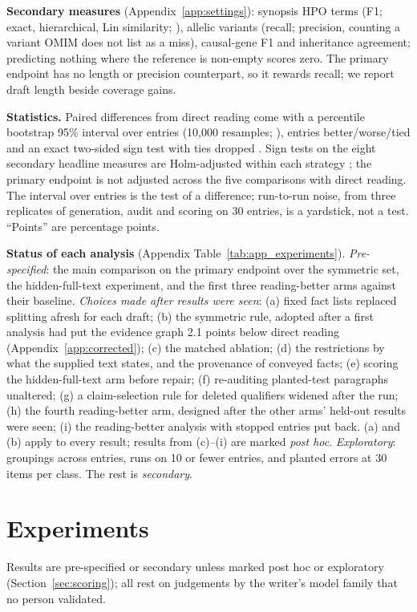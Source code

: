 \documentclass{article} %
\begin{document}
\textbf{Secondary measures} (Appendix~\ref{app:settings}): synopsis HPO terms (F1; exact, hierarchical, Lin similarity; \citealp{Khler2009ClinicalDiagnostics,Resnik1995UsingInformation}), allelic variants (recall; precision, counting a variant OMIM does not list as a miss), causal-gene F1 and inheritance agreement; predicting nothing where the reference is non-empty scores zero. The primary endpoint has no length or precision counterpart, so it rewards recall; we report draft length beside coverage gains.

\textbf{Statistics.} Paired differences from direct reading come with a percentile bootstrap 95\% interval over entries (10,000 resamples; \citealp{Efron1979BootstrapMethods}), entries better/worse/tied and an exact two-sided sign test with ties dropped \citep{Dixon1946StatisticalSign}. Sign tests on the eight secondary headline measures are Holm-adjusted within each strategy \citep{holm1979simple}; the primary endpoint is not adjusted across the five comparisons with direct reading. The interval over entries is the test of a difference; run-to-run noise, from three replicates of generation, audit and scoring on 30 entries, is a yardstick, not a test. ``Points'' are percentage points.

\textbf{Status of each analysis} (Appendix Table~\ref{tab:app_experiments}). \emph{Pre-specified}: the main comparison on the primary endpoint over the symmetric set, the hidden-full-text experiment, and the first three reading-better arms against their baseline. \emph{Choices made after results were seen}: (a) fixed fact lists replaced splitting afresh for each draft; (b) the symmetric rule, adopted after a first analysis had put the evidence graph 2.1 points below direct reading (Appendix~\ref{app:corrected}); (c) the matched ablation; (d) the restrictions by what the supplied text states, and the provenance of conveyed facts; (e) scoring the hidden-full-text arm before repair; (f) re-auditing planted-test paragraphs unaltered; (g) a claim-selection rule for deleted qualifiers widened after the run; (h) the fourth reading-better arm, designed after the other arms' held-out results were seen; (i) the reading-better analysis with stopped entries put back. (a) and (b) apply to every result; results from (c)--(i) are marked \emph{post hoc}. \emph{Exploratory}: groupings across entries, runs on 10 or fewer entries, and planted errors at 30 items per class. The rest is \emph{secondary}.

\section{Experiments}
\label{sec:experiments}
Results are pre-specified or secondary unless marked post hoc or exploratory (Section~\ref{sec:scoring}); all rest on judgements by the writer's model family that no person validated.
\end{document}
